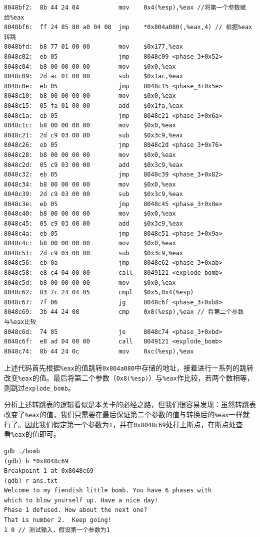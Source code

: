 \documentclass{paper}
\begin{document}
\begin{enumerate}
\begin{enumerate}
\begin{lstlisting}
8048bf2:  8b 44 24 04          	mov    0x4(%esp),%eax //将第一个参数赋给%eax
8048bf6:  ff 24 85 80 a0 04 08 	jmp    *0x804a080(,%eax,4) // 根据%eax转跳
8048bfd:  b8 77 01 00 00       	mov    $0x177,%eax
8048c02:  eb 05                	jmp    8048c09 <phase_3+0x52>
8048c04:  b8 00 00 00 00       	mov    $0x0,%eax
8048c09:  2d ac 01 00 00       	sub    $0x1ac,%eax
8048c0e:  eb 05                	jmp    8048c15 <phase_3+0x5e>
8048c10:  b8 00 00 00 00       	mov    $0x0,%eax
8048c15:  05 fa 01 00 00       	add    $0x1fa,%eax
8048c1a:  eb 05                	jmp    8048c21 <phase_3+0x6a>
8048c1c:  b8 00 00 00 00       	mov    $0x0,%eax
8048c21:  2d c9 03 00 00       	sub    $0x3c9,%eax
8048c26:  eb 05                	jmp    8048c2d <phase_3+0x76>
8048c28:  b8 00 00 00 00       	mov    $0x0,%eax
8048c2d:  05 c9 03 00 00       	add    $0x3c9,%eax
8048c32:  eb 05                	jmp    8048c39 <phase_3+0x82>
8048c34:  b8 00 00 00 00       	mov    $0x0,%eax
8048c39:  2d c9 03 00 00       	sub    $0x3c9,%eax
8048c3e:  eb 05                	jmp    8048c45 <phase_3+0x8e>
8048c40:  b8 00 00 00 00       	mov    $0x0,%eax
8048c45:  05 c9 03 00 00       	add    $0x3c9,%eax
8048c4a:  eb 05                	jmp    8048c51 <phase_3+0x9a>
8048c4c:  b8 00 00 00 00       	mov    $0x0,%eax
8048c51:  2d c9 03 00 00       	sub    $0x3c9,%eax
8048c56:  eb 0a                	jmp    8048c62 <phase_3+0xab>
8048c58:  e8 c4 04 00 00       	call   8049121 <explode_bomb>
8048c5d:  b8 00 00 00 00       	mov    $0x0,%eax
8048c62:  83 7c 24 04 05       	cmpl   $0x5,0x4(%esp)
8048c67:  7f 06                	jg     8048c6f <phase_3+0xb8>
8048c69:  3b 44 24 08          	cmp    0x8(%esp),%eax // 将第二个参数与%eax比较
8048c6d:  74 05                	je     8048c74 <phase_3+0xbd>
8048c6f:  e8 ad 04 00 00       	call   8049121 <explode_bomb>
8048c74:  8b 44 24 0c          	mov    0xc(%esp),%eax
\end{lstlisting}

上述代码首先根据\verb|%eax|的值跳转\verb|0x804a080|中存储的地址，接着进行一系列的跳转改变\verb|%eax|的值。最后将第二个参数（\verb|0x8(%esp)|）与\verb|%eax|作比较，若两个数相等，则跳过\verb|explode_bomb|。

分析上述转跳表的逻辑看似是本关卡的必经之路，但我们很容易发现：虽然转跳表改变了\verb|%eax|的值，我们只需要在最后保证第二个参数的值与转换后的\verb|%eax|一样就行了。因此我们假定第一个参数为\verb|1|，并在\verb|0x8048c69|处打上断点，在断点处查看\verb|%eax|的值即可。

\begin{lstlisting}
gdb ./bomb
(gdb) b *0x8048c69
Breakpoint 1 at 0x8048c69
(gdb) r ans.txt                                             
Welcome to my fiendish little bomb. You have 6 phases with
which to blow yourself up. Have a nice day!
Phase 1 defused. How about the next one?
That is number 2.  Keep going!
1 0 // 测试输入，假设第一个参数为1


\end{lstlisting}
\end{enumerate}
\end{enumerate}
\end{document}

